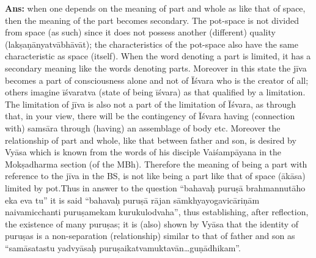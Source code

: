 \textbf{Ans:} when one depends on the meaning of part and whole as like that of space, then the meaning of the part becomes secondary. The pot-space is not divided from space (as such) since it does not possess another (different) quality (lakṣaṇānyatvābhāvāt); the characteristics of the pot-space also have the same characteristic as space (itself). When the word denoting a part is limited, it has a secondary meaning like the words denoting parts. Moreover in this state the jīva becomes a part of consciousness alone and not of Īśvara who is the creator of all; others imagine īśvaratva (state of being īśvara) as that qualified by a limitation. The limitation of jīva is also not a part of the limitation of Īśvara, as through that, in your view, there will be the contingency of Īśvara having (connection with) samsāra  through (having) an assemblage of body etc. Moreover the relationship of part and whole, like that between father and son, is desired by Vyāsa which is known from the words of his disciple Vaiśampāyana in the Mokṣadharma section (of the MBh). Therefore the meaning of being a part with reference to the jīva in the BS, is not like being a part like that of space (ākāsa) limited by pot.Thus in answer to the question “bahavaḥ puruṣā brahmannutāho eka eva tu” it is said “bahavaḥ puruṣā rājan sāmkhyayogavicāriṇām naivamicchanti puruṣamekam kurukulodvaha”, thus establishing, after reflection, the existence of many puruṣas; it is (also) shown by Vyāsa that the identity of puruṣas is a non-separation (relationship) similar to that of father and son as “samāsatastu yadvyāsaḥ puruṣaikatvamuktavān…guṇādhikam”.

